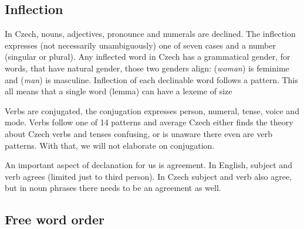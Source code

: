 \subsection{Inflection}
In Czech, nouns, adjectives, pronounce and numerals are declined. The inflection expresses (not necessarily unambiguously) one of seven cases and a number (singular or plural). Any inflected word in Czech has a grammatical gender, for words, that have natural gender, those two genders align:  (\textit{woman}) is feminime and  (\textit{man}) is masculine. Inflection of each declinable word follows a pattern. This all means that a single word (lemma) can have a lexeme of size 

Verbs are conjugated, the conjugation expresses person, numeral, tense, voice and mode. Verbs follow one of 14 patterns and average Czech either finds the theory about Czech verbs and tenses confusing, or is unaware there even are verb patterns. With that, we will not elaborate on conjugation.

An important aspect of declanation for us is agreement. In English, subject and verb agrees (limited just to third person). In Czech subject and verb also agree, but in noun phrases there needs to be an agreement as well.  

\subsection{Free word order}

